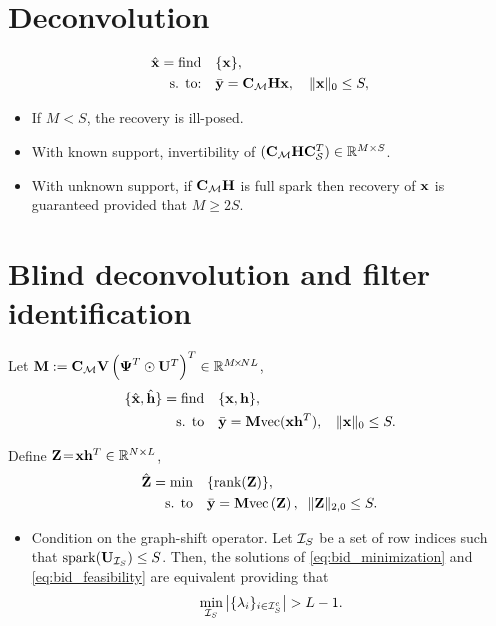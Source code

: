 \documentclass{article}
\def\Z{{\mathbf Z}}
\def\U{{\mathbf U}}
\def\M{{\mathbf M}}
\def\x{{\mathbf x}}
\def\y{{\mathbf y}}
\def\h{{\mathbf h}}
\def\Psib{{\boldsymbol \Psi}}
\begin{document}
\section*{Deconvolution}

\begin{align}
\label{eq:id_feasibility}
\hbx=\mathop{\text{find}} \quad & \{\bbx\},  \\
\text{s. to:} \quad & \bar{\y} = \bbC_{\ccalM} \bbH \x, \quad \|\x\|_{0}\leq S,\nonumber
\end{align}

\begin{itemize}
  \item If $M < S$, the recovery is ill-posed.
  \item With known support, invertibility of $({\mathbf C}_{{\mathcal M}} {\mathbf H} {\mathbf C}_{{\mathcal S}}^T)\in{\mathbb R}^{M\times S}$.
  \item With unknown support, if ${\mathbf C}_{{\mathcal M}} {\mathbf H}$ is full spark then recovery of ${\mathbf x}$ is guaranteed provided that $M \geq 2S$.
\end{itemize}

\section*{Blind deconvolution and filter identification}

\noindent
Let $\bbM:=\bbC_\ccalM \bbV \left(\Psib^T \odot \U^T \right)^T \in \reals^{M\!\times\! NL}$,
\begin{align}
\label{eq:bid_feasibility}
   \{\hbx,\hbh\}=\text{find} \quad &\{\x,\h\}, \\
  \text{s. to} \quad & \bar{\y} = \bbM \text{vec}(\x \h^T), \;\; \|\x\|_0 \leq S. \nonumber
\end{align}

\noindent
Define ${\mathbf Z}\!=\!{\mathbf x}{\mathbf h}^T\in{\mathbb R}^{N\times L}$,
\begin{align}
\label{eq:bid_minimization}
   \hbZ =\text{min} \quad &\{\text{rank}(\Z)\}, \\
  \text{s. to} \quad & \bar{\y} = \M \text{vec}\left(\Z\right), \;\; \|\Z\|_{2,0} \leq S. \nonumber
 \end{align}

 \begin{itemize}
   \item Condition on the graph-shift operator. Let ${\mathcal I}_{S}$ be a set of row indices such that $\mathrm{spark}({\mathbf U}_{{\mathcal I}_{S}}) \leq S$. Then, the solutions of \eqref{eq:bid_minimization} and \eqref{eq:bid_feasibility} are equivalent providing that 
	\begin{equation}\label{eq:condition_cardinality_lambdas}
		\min_{{\mathcal I}_{S}} \big| \{ \lambda_i \}_{i \in {\ensuremath{\mathcal I}}^c_{S}} \big| > L-1.
	\end{equation}
 \end{itemize}
\end{document}
